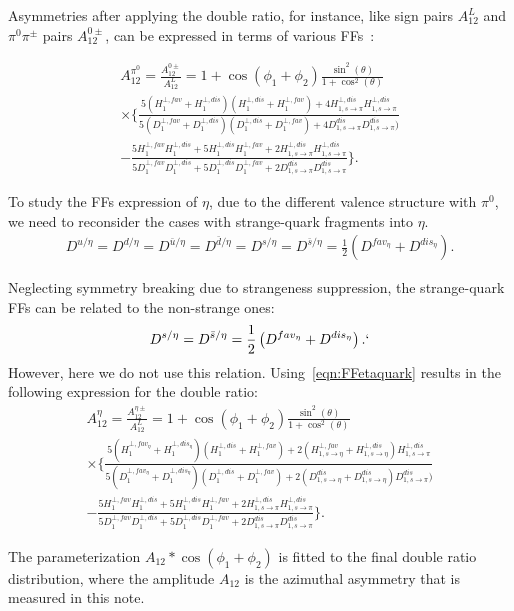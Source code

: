 Asymmetries after applying the double ratio, for instance, like sign pairs $A^L_{12}$ and $\pi^0\pi^{\pm}$ pairs $A^{0\pm}_{12}$, can be expressed in terms of various FFs~\cite{Efremov:2006qm}:

\begin{multline}
A_{12}^{\pi^0}=\frac{A^{0\pm}_{12}}{A^L_{12}}=1+\cos(\phi_1+\phi_2)\frac{\sin^2(\theta)}{1+\cos^2(\theta)} \\
\times\bigg\{\frac{5(H^{\bot,fav}_1+H^{\bot,dis}_1)(H^{\bot,dis}_1+H^{\bot,fav}_1)+4H^{\bot,dis}_{1,s\rightarrow\pi}H^{\bot,dis}_{1,s\rightarrow\pi}}{5(D^{\bot,fav}_1+D^{\bot,dis}_1)(D^{\bot,dis}_1+D^{\bot,fav}_1)+4D^{dis}_{1,s\rightarrow\pi}D^{dis}_{1,s\rightarrow\pi})}\\
-\frac{5H^{\bot,fav}_1H^{\bot,dis}_1+5H^{\bot,dis}_1H^{\bot,fav}_1+2H^{\bot,dis}_{1,s\rightarrow\pi}H^{\bot,dis}_{1,s\rightarrow\pi}}{5D^{\bot,fav}_1D^{\bot,dis}_1+5D^{\bot,dis}_1D^{\bot,fav}_1+2D^{dis}_{1,s\rightarrow\pi}D^{dis}_{1,s\rightarrow\pi}} \bigg\}.
\label{eqn:FF5}
\end{multline}

To study the FFs expression of $\eta$, due to the different valence structure with $\pi^0$, we need to reconsider the cases with strange-quark fragments into $\eta$. 
\begin{equation}
\begin{aligned}
D^{u/{\eta}}=D^{d/{\eta}}=D^{\bar{u}/{\eta}}=D^{\bar{d}/{\eta}}=D^{s/{\eta}}=D^{\bar{s}/{\eta}}=\frac{1}{2}\left(D^{fav_\eta}+D^{dis_\eta}\right).
\label{eqn:FFetaquark}
\end{aligned}
\end{equation}

Neglecting symmetry breaking due to strangeness suppression, the strange-quark FFs can be related to the non-strange ones:
\begin{equation}
\begin{aligned}
D^{s/{\eta}}=D^{\bar{s}/{\eta}}=\frac{1}{2}\left(D^{fav_\eta}+D^{dis_\eta}\right).`
\end{aligned}
\end{equation}
However, here we do not use this relation. Using~\ref{eqn:FFetaquark} results in the following expression for the double ratio:
\begin{multline}
A_{12}^{\eta}=\frac{A^{\eta\pm}_{12}}{A^L_{12}}=1+\cos(\phi_1+\phi_2)\frac{\sin^2(\theta)}{1+\cos^2(\theta)} \\
\times\bigg\{\frac{5(H^{\bot,fav_\eta}_1+H^{\bot,dis_\eta}_1)(H^{\bot,dis}_1+H^{\bot,fav}_1)+2(H^{\bot,fav}_{1,s\rightarrow\eta}+H^{\bot,dis}_{1,s\rightarrow\eta})H^{\bot,dis}_{1,s\rightarrow\pi}}{5(D^{\bot,fav_\eta}_1+D^{\bot,dis_\eta}_1)(D^{\bot,dis}_1+D^{\bot,fav}_1)+2(D^{dis}_{1,s\rightarrow\eta}+D^{dis}_{1,s\rightarrow\eta})D^{dis}_{1,s\rightarrow\pi})}\\
-\frac{5H^{\bot,fav}_1H^{\bot,dis}_1+5H^{\bot,dis}_1H^{\bot,fav}_1+2H^{\bot,dis}_{1,s\rightarrow\pi}H^{\bot,dis}_{1,s\rightarrow\pi}}{5D^{\bot,fav}_1D^{\bot,dis}_1+5D^{\bot,dis}_1D^{\bot,fav}_1+2D^{dis}_{1,s\rightarrow\pi}D^{dis}_{1,s\rightarrow\pi}} \bigg\}.
\label{eqn:FF5eta}
\end{multline}

The parameterization $A_{12}*\cos(\phi_1+\phi_2)$ is fitted to the final double ratio distribution, where the amplitude $A_{12}$ is the azimuthal asymmetry that is measured in this note. 